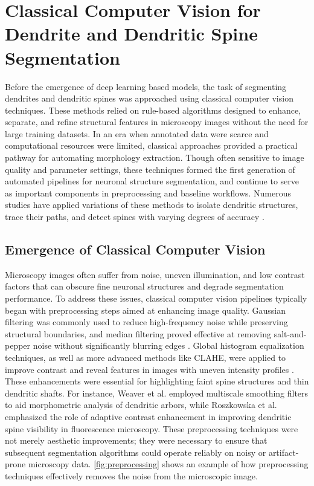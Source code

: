 \section{Classical Computer Vision for Dendrite and Dendritic Spine Segmentation}
Before the emergence of deep learning based models, the task of segmenting dendrites and dendritic spines was approached using classical computer vision techniques. These methods relied on rule-based algorithms designed to enhance, separate, and refine structural features in microscopy images without the need for large training datasets. In an era when annotated data were scarce and computational resources were limited, classical approaches provided a practical pathway for automating morphology extraction. Though often sensitive to image quality and parameter settings, these techniques formed the first generation of automated pipelines for neuronal structure segmentation, and continue to serve as important components in preprocessing and baseline workflows. Numerous studies have applied variations of these methods to isolate dendritic structures, trace their paths, and detect spines with varying degrees of accuracy \cite{Weaver_2004, Okabe_2020, Erdil_2013}.

\subsection{Emergence of Classical Computer Vision}

Microscopy images often suffer from noise, uneven illumination, and low contrast factors that can obscure fine neuronal structures and degrade segmentation performance. To address these issues, classical computer vision pipelines typically began with preprocessing steps aimed at enhancing image quality. Gaussian filtering was commonly used to reduce high-frequency noise while preserving structural boundaries, and median filtering proved effective at removing salt-and-pepper noise without significantly blurring edges \cite{Marr_1980, Tukey_1977}. Global histogram equalization techniques, as well as more advanced methods like \gls{CLAHE}, were applied to improve contrast and reveal features in images with uneven intensity profiles \cite{Gonzalez_2002, Zuiderveld_1994}. These enhancements were essential for highlighting faint spine structures and thin dendritic shafts. For instance, Weaver et al. \cite{Weaver_2004} employed multiscale smoothing filters to aid morphometric analysis of dendritic arbors, while Roszkowska et al. \cite{Roszkowska_2016} emphasized the role of adaptive contrast enhancement in improving dendritic spine visibility in fluorescence microscopy. These preprocessing techniques were not merely aesthetic improvements; they were necessary to ensure that subsequent segmentation algorithms could operate reliably on noisy or artifact-prone microscopy data. \autoref{fig:preprocessing} shows an example of how preprocessing techniques effectively removes the noise from the microscopic image.

